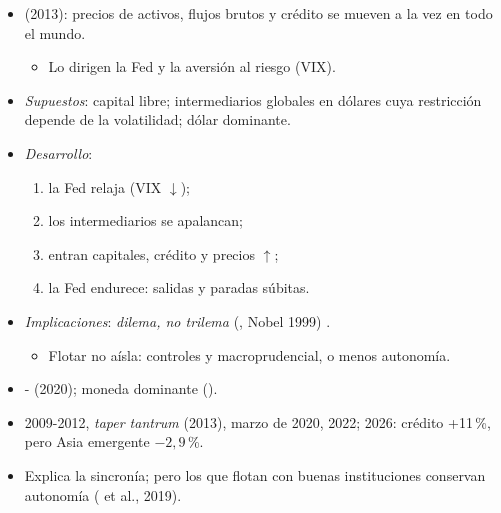 \documentclass{article}
\begin{document}
\begin{columnas}
\begin{itemize}
\item {} (2013): precios de activos, flujos brutos y crédito se mueven a la vez en todo el mundo.
  \begin{itemize}
  \item Lo dirigen la Fed y la aversión al riesgo (VIX).
  \end{itemize}
\end{itemize}
\begin{itemize}
\item \emph{Supuestos}: capital libre; intermediarios globales en dólares cuya restricción depende de la volatilidad; dólar dominante.
\item \emph{Desarrollo}:
  \begin{enumerate}
  \item la Fed relaja (VIX $\downarrow$);
  \item los intermediarios se apalancan;
  \item entran capitales, crédito y precios $\uparrow$;
  \item la Fed endurece: salidas y paradas súbitas.
  \end{enumerate}
\end{itemize}
\begin{itemize}
\item \emph{Implicaciones}: \emph{dilema, no trilema} (, Nobel 1999) .
  \begin{itemize}
  \item Flotar no aísla: controles y macroprudencial, o menos autonomía.
  \end{itemize}
\end{itemize}
\begin{itemize}
\item {}- (2020); moneda dominante ().
\item 2009-2012, \emph{taper tantrum} (2013), marzo de 2020, 2022; 2026: crédito +11\,\%, pero Asia emergente $-2{,}9$\,\%.
\item Explica la sincronía; pero los que flotan con buenas instituciones conservan autonomía ( et al., 2019).
\end{itemize}


\end{columnas}
\end{document}
